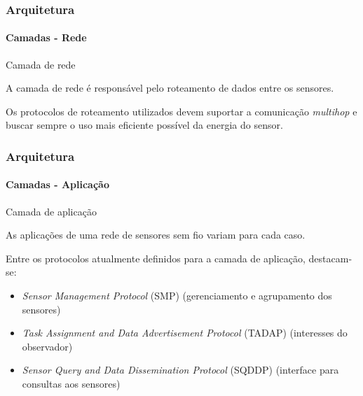 \documentclass[notes]{beamer}
\begin{document}
\begin{frame}
\label{slide_44}
\frametitle{Arquitetura}
\framesubtitle{Camadas - Rede}

\begin{block}{Camada de rede}

A camada de rede é responsável pelo roteamento de dados entre os sensores. 

\end{block} \pause

\begin{alertblock}

Os protocolos de roteamento utilizados devem suportar a comunicação \textit{multihop} e buscar sempre o uso mais eficiente possível da energia do sensor.

\end{alertblock}

\end{frame}

\begin{frame}
\label{slide_45}
\frametitle{Arquitetura}
\framesubtitle{Camadas - Aplicação}

\begin{block}{Camada de aplicação}

As aplicações de uma rede de sensores sem fio variam para cada caso.

\end{block} \pause

\begin{block}

Entre os protocolos atualmente definidos para a camada de aplicação, destacam-se: \pause

\begin{itemize}

\item \textit{Sensor Management Protocol} (SMP) (gerenciamento e agrupamento dos sensores) \pause
\item \textit{Task Assignment and Data Advertisement Protocol}   (TADAP) (interesses do observador) \pause
\item \textit{Sensor Query and Data Dissemination Protocol} (SQDDP) (interface para consultas aos sensores)

\end{itemize}

\end{block}

\end{frame}
\end{document}
